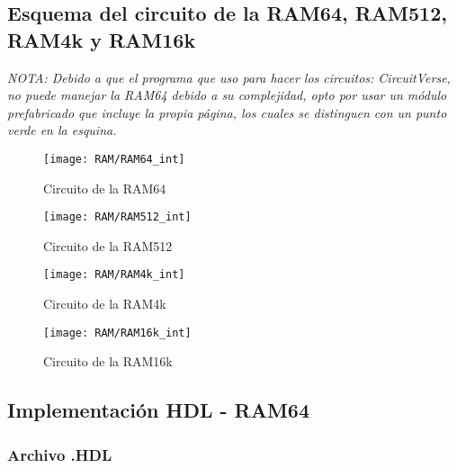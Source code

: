 \documentclass[12pt]{article}
\begin{document}
    \subsection{Esquema del circuito de la RAM64, RAM512, RAM4k y RAM16k}
		\footnotesize{\textit{NOTA: Debido a que el programa que uso para hacer los circuitos: CircuitVerse, no puede manejar la RAM64 debido a su complejidad, opto por usar un módulo prefabricado que incluye la propia página, los cuales se distinguen con un punto verde en la esquina.} }
		\begin{figure}[H]
			\centering
			\texttt{[image: RAM/RAM64\_int]}
			\caption{Circuito de la RAM64}
			\label{fig:ram64int}
		\end{figure}

		\begin{figure}[H]
			\centering
			\texttt{[image: RAM/RAM512\_int]}
			\caption{Circuito de la RAM512}
			\label{fig:ram512int}
		\end{figure}

		\begin{figure}[H]
			\centering
			\texttt{[image: RAM/RAM4k\_int]}
			\caption{Circuito de la RAM4k}
			\label{fig:ram4kint}
		\end{figure}

		\begin{figure}[H]
			\centering
			\texttt{[image: RAM/RAM16k\_int]}
			\caption{Circuito de la RAM16k}
			\label{fig:ram16kint}
		\end{figure}

    \subsection{Implementación HDL - RAM64}

        \subsubsection{Archivo .HDL}
\end{document}
